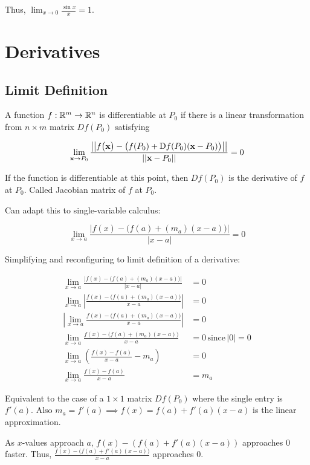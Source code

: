 Thus, $\lim_{x\to 0}\frac{\sin x}{x}=1$.

\section{Derivatives}

\subsection{Limit Definition}

A function $f:\mathbb{R}^m \to \mathbb{R}^n$ is differentiable at $P_0$ if there is a linear transformation from $n\times m$ matrix $Df(P_0)$ satisfying

\[\lim_{\textbf{x}\to P_0}\frac{\big\vert \big\vert f \big( \textbf{x} \big)-\big(f(P_0)+\mathrm{D}f(P_0)(\textbf{x}-P_0) \big) \big\vert \big\vert}{\vert \vert \textbf{x}-P_0 \vert \vert}=0\]

If the function is differentiable at this point, then $Df(P_0)$ is the derivative of $f$ at $P_0$. Called Jacobian matrix of $f$ at $P_0$.

Can adapt this to single-variable calculus:

\[\displaystyle \lim_{x\to a} \frac{\vert f(x)-\big(f(a)+(m_a)(x-a)\big) \vert}{\vert x-a \vert}=0\]

Simplifying and reconfiguring to limit definition of a derivative:

\begin{align*}
    \lim_{x\to a} \frac{\vert f(x)-\big(f(a)+(m_a)(x-a)\big) \vert}{\vert x-a \vert}&=0\\
    \lim_{x\to a}\left\vert \frac{f(x)-\big(f(a)+(m_a)(x-a)\big)}{x-a} \right\vert&=0\\
    \left \vert \lim_{x\to a} \frac{f(x)-\big(f(a)+(m_a)(x-a)\big)}{x-a} \right \vert&=0\\
    \lim_{x\to a} \frac{f(x)-\big(f(a)+(m_a)(x-a)\big)}{x-a}&=0 \, \mbox{since}\, \vert 0 \vert=0\\ 
    \lim_{x\to a} \left( \frac{f(x)-f(a)}{x-a}-m_a\right)&=0\\
    \lim_{x\to a}\frac{f(x)-f(a)}{x-a}&=m_a
\end{align*}

Equivalent to the case of a $1\times 1$ matrix $Df(P_0)$ where the single entry is $f'(a)$.
Also $m_a=f'(a)\implies f(x)=f(a)+f'(a)(x-a)$ is the linear approximation. 

As $x$-values approach $a$, $f(x)-(f(a)+f'(a)(x-a))$ approaches 0 faster. Thus, $\frac{f(x)-\big(f(a)+f'(a)(x-a)\big)}{x-a}$ approaches 0.


